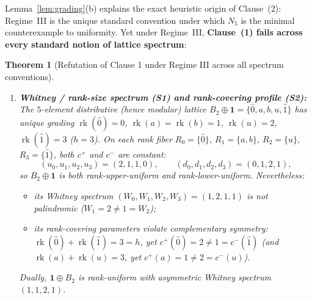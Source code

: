 \documentclass[11pt,a4paper]{article}
\newtheorem{theorem}{Theorem}[section]
\theoremstyle{definition}
\theoremstyle{remark}
\newcommand{\rk}{\operatorname{rk}}
\begin{document}
Lemma~\ref{lem:grading}(b) explains the exact heuristic origin of Clause~(2): Regime~III is the unique standard convention under which $N_5$ is the minimal counterexample to uniformity. Yet under Regime~III, \textbf{Clause~(1) fails across every standard notion of lattice spectrum}:

\begin{theorem}[Refutation of Clause 1 under Regime III across all spectrum conventions]\label{thm:regime-III}
\leavevmode
\begin{enumerate}
  \item[(1)] \textbf{Whitney / rank-size spectrum (S1) and rank-covering profile (S2):} The $5$-element distributive (hence modular) lattice $B_2 \oplus \mathbf{1} = \{\hat{0}, a, b, u, \hat{1}\}$ has unique grading $\rk(\hat{0})=0$, $\rk(a)=\rk(b)=1$, $\rk(u)=2$, $\rk(\hat{1})=3$ ($h=3$). On each rank fiber $R_0=\{\hat{0}\}$, $R_1=\{a,b\}$, $R_2=\{u\}$, $R_3=\{\hat{1}\}$, both $c^+$ and $c^-$ are constant:
  \[
    (u_0, u_1, u_2, u_3) = (2, 1, 1, 0), \qquad (d_0, d_1, d_2, d_3) = (0, 1, 2, 1),
  \]
  so $B_2 \oplus \mathbf{1}$ is \emph{both} rank-upper-uniform and rank-lower-uniform. Nevertheless:
  \begin{itemize}
    \item its Whitney spectrum $(W_0, W_1, W_2, W_3) = (1, 2, 1, 1)$ is \emph{not} palindromic ($W_1 = 2 \neq 1 = W_2$);
    \item its rank-covering parameters violate complementary symmetry: $\rk(\hat{0}) + \rk(\hat{1}) = 3 = h$, yet $c^+(\hat{0}) = 2 \neq 1 = c^-(\hat{1})$ (and $\rk(a) + \rk(u) = 3$, yet $c^+(a) = 1 \neq 2 = c^-(u)$).
  \end{itemize}
  Dually, $\mathbf{1} \oplus B_2$ is rank-uniform with asymmetric Whitney spectrum $(1, 1, 2, 1)$.


\end{enumerate}
\end{theorem}
\end{document}
